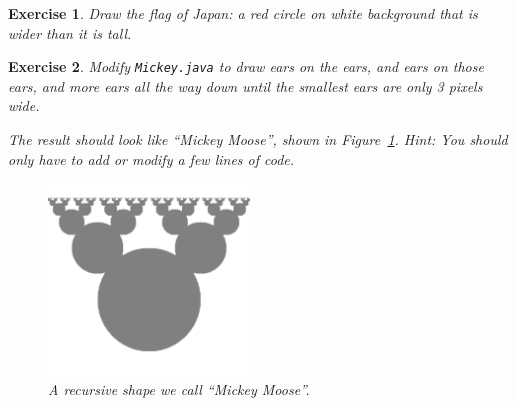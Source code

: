 \documentclass[12pt]{book}
\theoremstyle{exercise}
\newtheorem{exercise}{Exercise}[chapter]
\begin{document}
\begin{exercise}
Draw the flag of Japan: a red circle on white background that is wider than it is tall.
\end{exercise}


\begin{exercise}
Modify {\tt Mickey.java} to draw ears on the ears, and ears on those ears, and more ears all the way down until the smallest ears are only 3 pixels wide.

The result should look like ``Mickey Moose'', shown in Figure~\ref{fig.moose}.
{\em Hint:} You should only have to add or modify a few lines of code.

\begin{figure}[!ht]
\begin{center}
\includegraphics[height=2in]{figs/moose.pdf}
\caption{A recursive shape we call ``Mickey Moose''.}
\label{fig.moose}
\end{center}
\end{figure}

\end{exercise}
\end{document}
